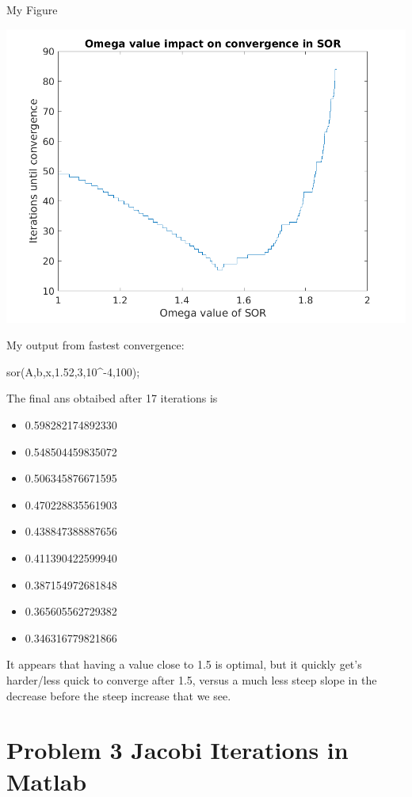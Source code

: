 \documentclass[]{article}
\providecommand{\tightlist}{%
  \setlength{\itemsep}{0pt}\setlength{\parskip}{0pt}}
\begin{document}
My Figure

\includegraphics{./Problem2Fig.png}

My output from fastest convergence:

sor(A,b,x,1.52,3,10\^{}-4,100);

The final ans obtaibed after 17 iterations is

\begin{itemize}
\tightlist
\item
  0.598282174892330
\item
  0.548504459835072
\item
  0.506345876671595
\item
  0.470228835561903
\item
  0.438847388887656
\item
  0.411390422599940
\item
  0.387154972681848
\item
  0.365605562729382
\item
  0.346316779821866
\end{itemize}

It appears that having a value close to 1.5 is optimal, but it quickly
get's harder/less quick to converge after 1.5, versus a much less steep
slope in the decrease before the steep increase that we see.

\hypertarget{problem-3-jacobi-iterations-in-matlab}{%
\section{Problem 3 Jacobi Iterations in
Matlab}\label{problem-3-jacobi-iterations-in-matlab}}
\end{document}
